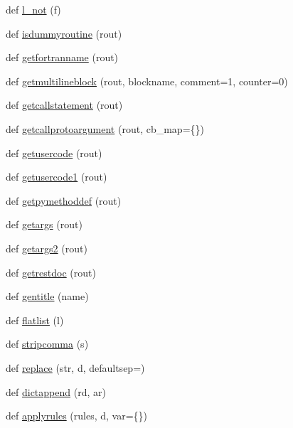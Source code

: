 \begin{DoxyCompactItemize}
\item 
def \hyperlink{namespacenumpy_1_1f2py_1_1auxfuncs_a601e4e877b21c8804cf89f9a6a156513}{l\+\_\+not} (f)
\item 
def \hyperlink{namespacenumpy_1_1f2py_1_1auxfuncs_ae040b0078ed29f8be5dbd743d3346f87}{isdummyroutine} (rout)
\item 
def \hyperlink{namespacenumpy_1_1f2py_1_1auxfuncs_aa687977f740fec71d96ce17dedded536}{getfortranname} (rout)
\item 
def \hyperlink{namespacenumpy_1_1f2py_1_1auxfuncs_a5e30435d3b2b528b86ab6d734acc3431}{getmultilineblock} (rout, blockname, comment=1, counter=0)
\item 
def \hyperlink{namespacenumpy_1_1f2py_1_1auxfuncs_af5eee32b4a291a6c5de14b8e1c147598}{getcallstatement} (rout)
\item 
def \hyperlink{namespacenumpy_1_1f2py_1_1auxfuncs_ad0bd063df19998022363af6925b0b3a8}{getcallprotoargument} (rout, cb\+\_\+map=\{\})
\item 
def \hyperlink{namespacenumpy_1_1f2py_1_1auxfuncs_ae8c698d63cab50bca09087c1bdf5a7e8}{getusercode} (rout)
\item 
def \hyperlink{namespacenumpy_1_1f2py_1_1auxfuncs_a5b9edb6753d564f43d4ff8ac30372f8f}{getusercode1} (rout)
\item 
def \hyperlink{namespacenumpy_1_1f2py_1_1auxfuncs_a5c615f23439893768d1ec64a3ba01d01}{getpymethoddef} (rout)
\item 
def \hyperlink{namespacenumpy_1_1f2py_1_1auxfuncs_ac1a166f4fe4aa8ca13049d01071369c4}{getargs} (rout)
\item 
def \hyperlink{namespacenumpy_1_1f2py_1_1auxfuncs_aa99745373f6bbaec8fc5722e7029f938}{getargs2} (rout)
\item 
def \hyperlink{namespacenumpy_1_1f2py_1_1auxfuncs_ad6d5d46adb4174fbe76e8ca2fbca4651}{getrestdoc} (rout)
\item 
def \hyperlink{namespacenumpy_1_1f2py_1_1auxfuncs_a17196cf29e2032f046a49ad36c041aec}{gentitle} (name)
\item 
def \hyperlink{namespacenumpy_1_1f2py_1_1auxfuncs_ae2335edc8caee8f278acb40ff96dc5b4}{flatlist} (l)
\item 
def \hyperlink{namespacenumpy_1_1f2py_1_1auxfuncs_ac02fa685214850c80e4577bf1c42fee5}{stripcomma} (s)
\item 
def \hyperlink{namespacenumpy_1_1f2py_1_1auxfuncs_a7e85efc7d22dbbbd390bd414d9247fef}{replace} (str, d, defaultsep=\textquotesingle{}\textquotesingle{})
\item 
def \hyperlink{namespacenumpy_1_1f2py_1_1auxfuncs_aa8acd7a04aa15378d4b91c9f1797b9c4}{dictappend} (rd, ar)
\item 
def \hyperlink{namespacenumpy_1_1f2py_1_1auxfuncs_a36b24b561287d2325984a432b46e66b4}{applyrules} (rules, d, var=\{\})
\end{DoxyCompactItemize}
